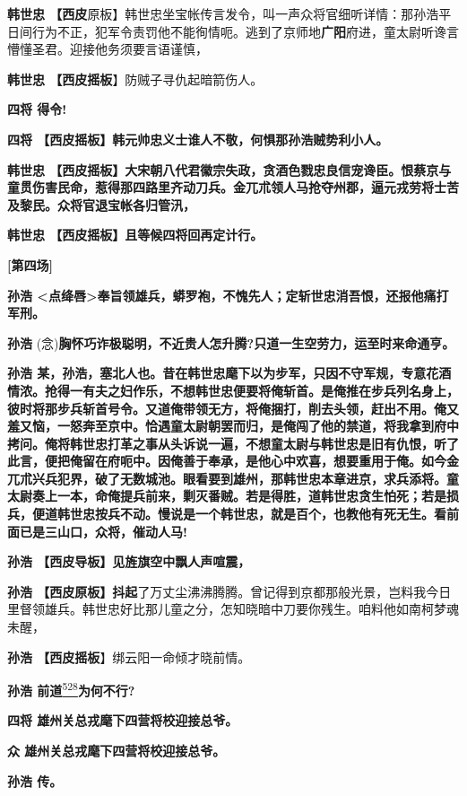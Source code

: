 \textbf{韩世忠
【西皮}原板】韩世忠坐宝帐传言发令，叫一声众将官细听详情：那孙浩平日间行为不正，犯军令责罚他不能徇情呃。逃到了京师地\textbf{广阳}府进，童太尉听谗言懵懂圣君。迎接他务须要言语谨慎，

\textbf{韩世忠 【西皮摇板}】防贼子寻仇起暗箭伤人。

\textbf{四将 得令!}

\textbf{四将 【西皮摇板】韩元帅忠义士谁人不敬，何惧那孙浩贼势利小人。}

\textbf{韩世忠
【西皮摇板】大宋朝八代君徽宗失政，贪酒色戮忠良信宠谗臣。恨蔡京与童贯伤害民命，惹得那四路里齐动刀兵。金兀朮领人马抢夺州郡，逼元戎劳将士苦及黎民。众将官退宝帐各归管汛，}

\textbf{韩世忠 【西皮摇板】且等候四将回再定计行。}

\textbf{{[}第四场{]}}

\textbf{孙浩
\textless{}点绛唇\textgreater{}奉旨领雄兵，蟒罗袍，不愧先人；定斩世忠消吾恨，还报他痛打军刑。}

\textbf{孙浩}
(念)\textbf{胸怀巧诈极聪明，不近贵人怎升腾?只道一生空劳力，运至时来命通亨。}

\textbf{孙浩
某，孙浩，塞北人也。昔在韩世忠麾下以为步军，只因不守军规，专意花酒情浓。抢得一有夫之妇作乐，不想韩世忠便要将俺斩首。是俺推在步兵列名身上，彼时将那步兵斩首号令。又道俺带领无方，将俺捆打，削去头领，赶出不用。俺又羞又恼，一怒奔至京中。恰遇童太尉朝罢而归，是俺闯了他的禁道，将我拿到府中拷问。俺将韩世忠打革之事从头诉说一遍，不想童太尉与韩世忠是旧有仇恨，听了此言，便把俺留在府呃中。因俺善于奉承，是他心中欢喜，想要重用于俺。如今金兀朮兴兵犯界，破了无数城池。眼看要到雄州，那韩世忠本章进京，求兵添将。童太尉奏上一本，命俺提兵前来，剿灭番贼。若是得胜，道韩世忠贪生怕死；若是损兵，便道韩世忠按兵不动。慢说是一个韩世忠，就是百个，也教他有死无生。看前面已是三山口，众将，催动人马!}

\textbf{孙浩 【西皮导板】见旌旗空中飘人声喧震，}

\textbf{孙浩
【西皮原板】抖起}了万丈尘沸沸腾腾。曾记得到京都那般光景，岂料我今日里督领雄兵。韩世忠好比那儿童之分，怎知晓暗中刀要你残生。咱料他如南柯梦魂未醒，

\textbf{孙浩 【西皮摇板}】绑云阳一命倾才晓前情。

\textbf{孙浩
前道}\protect\hyperlink{fn528}{\textsuperscript{528}}\textbf{为何不行?}

\textbf{四将 雄州关总戎麾下四营将校迎接总爷。}

\textbf{众 雄州关总戎麾下四营将校迎接总爷。}

\textbf{孙浩 传。}

